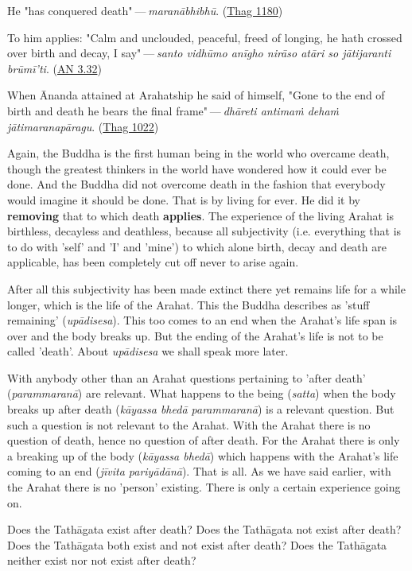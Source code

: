 He "has conquered death" — \emph{maranābhibhū}. (\href{https://suttacentral.net/thag20.1/en/sujato}{Thag 1180})


To him applies: "Calm and unclouded, peaceful, freed of longing, he hath crossed
over birth and decay, I say" — \emph{santo vidhūmo anīgho nirāso atāri so
jātijaranti brūmī’ti}. (\href{https://suttacentral.net/an3.32/en/bodhi}{AN 3.32})


When Ānanda attained at Arahatship he said of himself, "Gone to the end of birth
and death he bears the final frame" — \emph{dhāreti antimaṁ dehaṁ
jātimaranapāragu}. (\href{https://suttacentral.net/thag17.3/en/sujato}{Thag 1022})


Again, the Buddha is the first human being in the world who overcame
death, though the greatest thinkers in the world have wondered how it
could ever be done. And the Buddha did not overcome death in the fashion
that everybody would imagine it should be done. That is by living for
ever. He did it by \textbf{removing} that to which death \textbf{applies}. The
experience of the living Arahat is birthless, decayless and deathless,
because all subjectivity (i.e. everything that is to do with 'self' and
'I' and 'mine') to which alone birth, decay and death are applicable,
has been completely cut off never to arise again.


After all this subjectivity has been made extinct there yet remains life
for a while longer, which is the life of the Arahat. This the Buddha
describes as 'stuff remaining' (\emph{upādisesa}). This too comes to an end
when the Arahat’s life span is over and the body breaks up. But the
ending of the Arahat’s life is not to be called 'death'. About
\emph{upādisesa} we shall speak more later.


With anybody other than an Arahat questions pertaining to 'after death'
(\emph{parammaranā}) are relevant. What happens to the being (\emph{satta})
when the body breaks up after death (\emph{kāyassa bhedā parammaranā}) is a
relevant question. But such a question is not relevant to the Arahat.
With the Arahat there is no question of death, hence no question of
after death. For the Arahat there is only a breaking up of the body
(\emph{kāyassa bhedā}) which happens with the Arahat’s life coming to an
end (\emph{jīvita pariyādānā}). That is all. As we have said earlier, with
the Arahat there is no 'person' existing. There is only a certain
experience going on.


Does the Tathāgata exist after death? Does the Tathāgata not exist after
death? Does the Tathāgata both exist and not exist after death? Does the
Tathāgata neither exist nor not exist after death?


